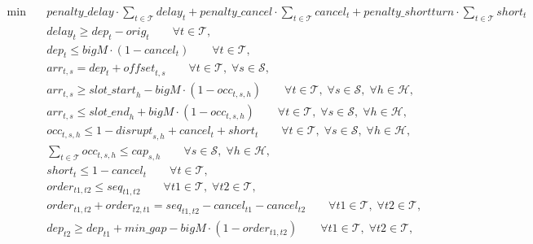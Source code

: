 \begin{align}
  \min\quad & \mathit{penalty\_delay} \cdot \sum_{t \in \mathcal{T}} delay_{t}
            + \mathit{penalty\_cancel} \cdot \sum_{t \in \mathcal{T}} cancel_{t}
            + \mathit{penalty\_shortturn} \cdot \sum_{t \in \mathcal{T}} short_{t}
            \tag{total\_cost} \\
  & delay_{t} \ge dep_{t} - \mathit{orig}_{t}
            \qquad \forall t \in \mathcal{T},
            \tag{delay\_def} \\
  & dep_{t} \le \mathit{bigM} \cdot (1 - cancel_{t})
            \qquad \forall t \in \mathcal{T},
            \tag{dep\_cancel} \\
  & arr_{t,s} = dep_{t} + \mathit{offset}_{t,s}
            \qquad \forall t \in \mathcal{T},\; \forall s \in \mathcal{S},
            \tag{arrival\_def} \\
  & arr_{t,s} \ge \mathit{slot\_start}_{h} - \mathit{bigM} \cdot (1 - occ_{t,s,h})
            \qquad \forall t \in \mathcal{T},\; \forall s \in \mathcal{S},\; \forall h \in \mathcal{H},
            \tag{occ\_lower} \\
  & arr_{t,s} \le \mathit{slot\_end}_{h} + \mathit{bigM} \cdot (1 - occ_{t,s,h})
            \qquad \forall t \in \mathcal{T},\; \forall s \in \mathcal{S},\; \forall h \in \mathcal{H},
            \tag{occ\_upper} \\
  & occ_{t,s,h} \le 1 - \mathit{disrupt}_{s,h} + cancel_{t} + short_{t}
            \qquad \forall t \in \mathcal{T},\; \forall s \in \mathcal{S},\; \forall h \in \mathcal{H},
            \tag{disrupt\_occ} \\
  & \sum_{t \in \mathcal{T}} occ_{t,s,h} \le \mathit{cap}_{s,h}
            \qquad \forall s \in \mathcal{S},\; \forall h \in \mathcal{H},
            \tag{platform\_cap} \\
  & short_{t} \le 1 - cancel_{t}
            \qquad \forall t \in \mathcal{T},
            \tag{short\_cancel} \\
  & order_{t1,t2} \le \mathit{seq}_{t1,t2}
            \qquad \forall t1 \in \mathcal{T},\; \forall t2 \in \mathcal{T},
            \tag{order\_seq} \\
  & order_{t1,t2} + order_{t2,t1} = \mathit{seq}_{t1,t2} - cancel_{t1} - cancel_{t2}
            \qquad \forall t1 \in \mathcal{T},\; \forall t2 \in \mathcal{T},
            \tag{order\_sym} \\
  & dep_{t2} \ge dep_{t1} + \mathit{min\_gap} - \mathit{bigM} \cdot (1 - order_{t1,t2})
            \qquad \forall t1 \in \mathcal{T},\; \forall t2 \in \mathcal{T},
            \tag{order\_time}
\end{align}